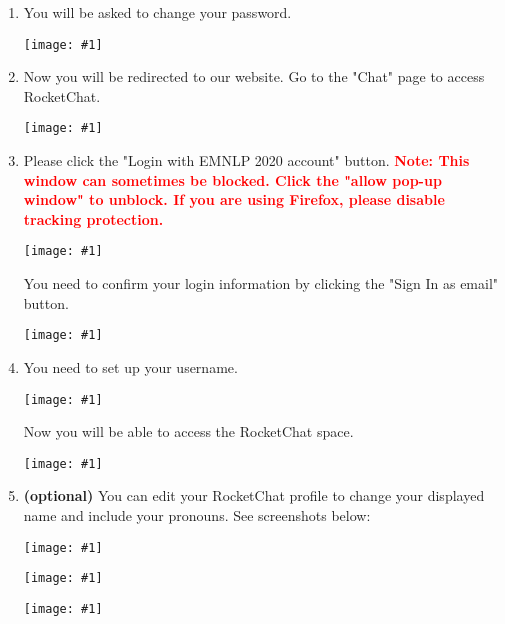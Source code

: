 \documentclass[11pt]{scrartcl}
\makeatletter
\newcommand{\vfig}[1]{%
	\begin{center}
		\texttt{[image: \#1]}
	\end{center}
}
\newcommand{\conferenceName}{EMNLP 2020\xspace}
\newcommand{\helpdeskEmail}{acl2020-virtual-helpdesk@googlegroups.com}
\makeatother
\begin{document}
\begin{enumerate}
\begin{sloppypar}
			\textbf{\textcolor{red}{PLEASE NOTE}}:
			\begin{itemize}
				\item Make sure you received a welcome email with username (see \cref{step:registration})
				\item The username is case-sensitive
				\item Make sure there are no extra spaces in your password
				\item Try typing in the username/pwd instead of copy pasting (just to make sure you don't miss out on any characters). \textbf{The password has 8 characters in total.}
			\end{itemize}
	
			If you are still unable to login, please contact: \href{mailto:\helpdeskEmail}{\helpdeskEmail} and \textbf{include the username/password you were sent in the welcome email}.

		\end{sloppypar}

		\vfig{sign-in}
	\item You will be asked to change your password.
	
		\vfig{change-password}
	
	
	\item Now you will be redirected to our website. Go to the "Chat" page to access RocketChat.
	
		\vfig{chat-page}
	
	\item Please click the "Login with \conferenceName account" button. \textbf{\textcolor{red}{Note: This window can sometimes be blocked. Click the "allow pop-up window" to unblock. If you are using Firefox, please disable tracking protection.}}
	
		\vfig{rocket-chat-login}
	
		You need to confirm your login information by clicking the "Sign In as {{email}}" button.
		
		\vfig{sign-in-as}
		
	\item You need to set up your username.
	
		\vfig{register-username}
	
		Now you will be able to access the RocketChat space.
		
		\vfig{rocket-chat-space}
	
	\item \textbf{(optional)} You can edit your RocketChat profile to change your displayed name and include your pronouns. See screenshots below:
		
		\vfig{rocket-chat-profile-1}
		\vfig{rocket-chat-profile-2}
		\vfig{rocket-chat-profile-3}
\end{enumerate}
	
\end{document}
